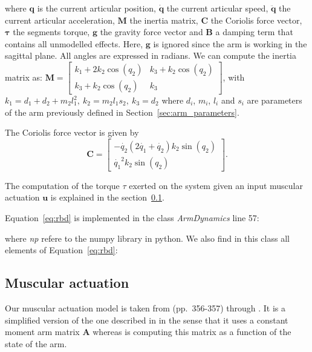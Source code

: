 \documentclass[pdftex,a4paper,11pt]{report}
\begin{document}
where $\textbf{q}$ is the current articular position, $\boldsymbol{\dot{q}}$ the current articular speed, $\boldsymbol{\ddot{q}}$ the current articular acceleration, $\textbf{M}$ the inertia matrix, $\textbf{C}$ the Coriolis force vector, $\boldsymbol{\tau}$ the segments torque, $\textbf{g}$ the gravity force vector and $\textbf{B}$ a damping term that contains all unmodelled effects.
Here, $\textbf{g}$ is ignored since the arm is working in the sagittal plane.
All angles are expressed in radians.
We can compute the inertia matrix as:
$
\textbf{M} = \begin{bmatrix}
           k_1 + 2 k_2 \cos(q_2)   &  k_3 + k_2 \cos(q_2) \\%
           k_3 + k_2 \cos(q_2)     &  k_3
          \end{bmatrix}
$, with $k_1 = d_1 + d_2 + m_2 l_1^2, ~ k_2 = m_2 l_1 s_2, ~ k_3 = d_2$ where $d_i$, $m_i$, $l_i$ and $s_i$ are parameters of the arm previously defined in Section~\ref{sec:arm_parameters}.

The Coriolis force vector is given by
$$
\textbf{C} = \begin{bmatrix}
           - \dot{q_2} (2 \dot{q_1} + \dot{q_2}) k_2 \sin(q_2)\\
            \dot{q_1}^2 k_2 \sin(q_2)
          \end{bmatrix}.
$$

The computation of the torque $\tau$ exerted on the system given an input muscular actuation $\textbf{u}$ is explained in the section~\ref{sec:muscular_actuation}.

Equation~\ref{eq:rbd} is implemented in the class \textit{ArmDynamics} line 57:

where \textit{np} refere to the numpy library in python.
We also find in this class all elements of Equation~\ref{eq:rbd}:


\subsection{Muscular actuation}
\label{sec:muscular_actuation}
Our muscular actuation model is taken from \cite{katayama93} (pp.~356-357) through \cite{mitrovic08_SAB}.
It is a simplified version of the one described in \cite{li2006} in the sense that it uses
a constant moment arm matrix $\textbf{A}$ whereas \cite{li2006} is computing this matrix as
a function of the state of the arm.
\end{document}
